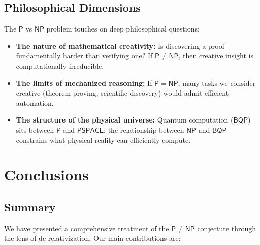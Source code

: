 \documentclass[11pt,a4paper]{article}
\theoremstyle{plain}
\theoremstyle{definition}
\theoremstyle{remark}
\newcommand{\PP}{\mathsf{P}}
\newcommand{\NP}{\mathsf{NP}}
\newcommand{\PSPACE}{\mathsf{PSPACE}}
\newcommand{\BQP}{\mathsf{BQP}}
\begin{document}
\subsection{Philosophical Dimensions}

The $\PP$ vs $\NP$ problem touches on deep philosophical questions:

\begin{itemize}
    \item \textbf{The nature of mathematical creativity:} Is discovering a proof
    fundamentally harder than verifying one?  If $\PP \neq \NP$, then creative
    insight is computationally irreducible.

    \item \textbf{The limits of mechanized reasoning:} If $\PP = \NP$, many
    tasks we consider creative (theorem proving, scientific discovery) would
    admit efficient automation.

    \item \textbf{The structure of the physical universe:} Quantum computation
    ($\BQP$) sits between $\PP$ and $\PSPACE$; the relationship between $\NP$
    and $\BQP$ constrains what physical reality can efficiently compute.
\end{itemize}

\section{Conclusions}\label{sec:conclusion}

\subsection{Summary}

We have presented a comprehensive treatment of the $\PP \neq \NP$ conjecture
through the lens of de-relativization.  Our main contributions are:
\end{document}
